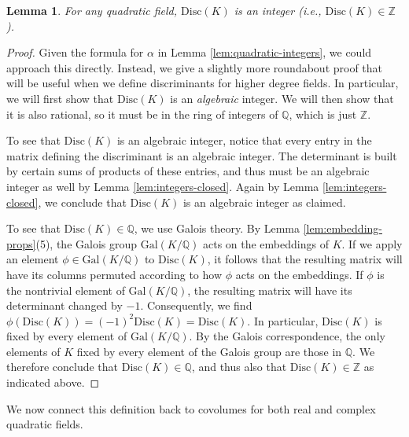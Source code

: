 \documentclass[12pt]{amsart}
\newtheorem{lemma}[theorem]{Lemma}
\theoremstyle{definition} \newtheorem*{notation}{Notation}
\theoremstyle{remark} \newtheorem*{remark}{Remark}
\theoremstyle{remark} \newtheorem*{example}{Example}
\theoremstyle{definition} \newtheorem*{definition}{Definition}
\numberwithin{equation}{section}
\numberwithin{theorem}{section}
\begin{document}
	\begin{lemma}\label{lem:disc-in-Z-quadratic}
		For any quadratic field, $\mathrm{Disc}(K)$ is an integer (i.e., $\mathrm{Disc}(K) \in \mathbb{Z}$).
	\end{lemma}
	\begin{proof}
		Given the formula for $\alpha$ in Lemma \ref{lem:quadratic-integers}, we could approach this directly.  Instead, we give a slightly more roundabout proof that will be useful when we define discriminants for higher degree fields.
		In particular, we will first show that $\mathrm{Disc}(K)$ is an \emph{algebraic} integer.  We will then show that it is also rational, so it must be in the ring of integers of $\mathbb{Q}$, which is just $\mathbb{Z}$.
		
		To see that $\mathrm{Disc}(K)$ is an algebraic integer, notice that every entry in the matrix defining the discriminant is an algebraic integer.  The determinant is built by certain sums of products of these entries, and thus must be an algebraic integer as well by Lemma \ref{lem:integers-closed}.  Again by Lemma \ref{lem:integers-closed}, we conclude that $\mathrm{Disc}(K)$ is an algebraic integer as claimed.
		
		To see that $\mathrm{Disc}(K) \in \mathbb{Q}$, we use Galois theory.  By Lemma \ref{lem:embedding-props}(5), the Galois group $\mathrm{Gal}(K/\mathbb{Q})$ acts on the embeddings of $K$.  If we apply an element $\phi \in \mathrm{Gal}(K/\mathbb{Q})$ to $\mathrm{Disc}(K)$, it follows that the resulting matrix will have its columns permuted according to how $\phi$ acts on the embeddings.  If $\phi$ is the nontrivial element of $\mathrm{Gal}(K/\mathbb{Q})$, the resulting matrix will have its determinant changed by $-1$.  Consequently, we find $\phi(\mathrm{Disc}(K)) = (-1)^2 \mathrm{Disc}(K) = \mathrm{Disc}(K)$.  In particular, $\mathrm{Disc}(K)$ is fixed by every element of $\mathrm{Gal}(K/\mathbb{Q})$.  By the Galois correspondence, the only elements of $K$ fixed by every element of the Galois group are those in $\mathbb{Q}$.  We therefore conclude that $\mathrm{Disc}(K) \in \mathbb{Q}$, and thus also that $\mathrm{Disc}(K) \in \mathbb{Z}$ as indicated above.
	\end{proof}
	
	We now connect this definition back to covolumes for both real and complex quadratic fields.
	
\end{document}
